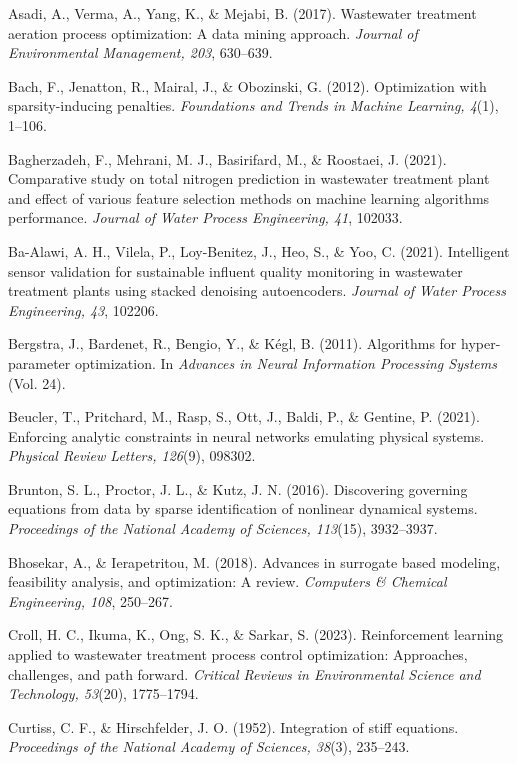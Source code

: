 \documentclass[a4paper,fleqn]{cas-sc}
\begin{document}
\noindent Asadi, A., Verma, A., Yang, K., \& Mejabi, B. (2017). Wastewater treatment aeration process optimization: A data mining approach. \textit{Journal of Environmental Management, 203}, 630--639.

\noindent Bach, F., Jenatton, R., Mairal, J., \& Obozinski, G. (2012). Optimization with sparsity-inducing penalties. \textit{Foundations and Trends in Machine Learning, 4}(1), 1--106.

\noindent Bagherzadeh, F., Mehrani, M. J., Basirifard, M., \& Roostaei, J. (2021). Comparative study on total nitrogen prediction in wastewater treatment plant and effect of various feature selection methods on machine learning algorithms performance. \textit{Journal of Water Process Engineering, 41}, 102033.

\noindent Ba-Alawi, A. H., Vilela, P., Loy-Benitez, J., Heo, S., \& Yoo, C. (2021). Intelligent sensor validation for sustainable influent quality monitoring in wastewater treatment plants using stacked denoising autoencoders. \textit{Journal of Water Process Engineering, 43}, 102206.

\noindent Bergstra, J., Bardenet, R., Bengio, Y., \& K\'egl, B. (2011). Algorithms for hyper-parameter optimization. In \textit{Advances in Neural Information Processing Systems} (Vol. 24).

\noindent Beucler, T., Pritchard, M., Rasp, S., Ott, J., Baldi, P., \& Gentine, P. (2021). Enforcing analytic constraints in neural networks emulating physical systems. \textit{Physical Review Letters, 126}(9), 098302.

\noindent Brunton, S. L., Proctor, J. L., \& Kutz, J. N. (2016). Discovering governing equations from data by sparse identification of nonlinear dynamical systems. \textit{Proceedings of the National Academy of Sciences, 113}(15), 3932--3937.

\noindent Bhosekar, A., \& Ierapetritou, M. (2018). Advances in surrogate based modeling, feasibility analysis, and optimization: A review. \textit{Computers \& Chemical Engineering, 108}, 250--267.

\noindent Croll, H. C., Ikuma, K., Ong, S. K., \& Sarkar, S. (2023). Reinforcement learning applied to wastewater treatment process control optimization: Approaches, challenges, and path forward. \textit{Critical Reviews in Environmental Science and Technology, 53}(20), 1775--1794.

\noindent Curtiss, C. F., \& Hirschfelder, J. O. (1952). Integration of stiff equations. \textit{Proceedings of the National Academy of Sciences, 38}(3), 235--243.
\end{document}

